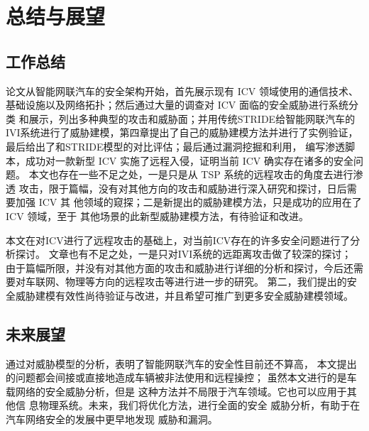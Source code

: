 \chapter{总结与展望}
\label{ch6}

\section{工作总结}
论文从智能网联汽车的安全架构开始，首先展示现有 ICV 领域使用的通信技术、
基础设施以及网络拓扑；然后通过大量的调查对 ICV 面临的安全威胁进行系统分类
和展示，列出多种典型的攻击和威胁面；并用传统STRIDE给智能网联汽车的IVI系统进行了威胁建模，第四章提出了自己的威胁建模方法并进行了实例验证，最后给出了和STRIDE模型的对比评估；最后通过漏洞挖掘和利用，
编写渗透脚本，成功对一款新型 ICV 实施了远程入侵，证明当前 ICV 确实存在诸多的安全问题。
本文也存在一些不足之处，一是只是从 TSP 系统的远程攻击的角度去进行渗透
攻击，限于篇幅，没有对其他方向的攻击和威胁进行深入研究和探讨，日后需要加强 ICV 其
他领域的窥探；二是新提出的威胁建模方法，只是成功的应用在了 ICV 领域，至于
其他场景的此新型威胁建模方法，有待验证和改进。

本文在对ICV进行了远程攻击的基础上，对当前ICV存在的许多安全问题进行了分析探讨。
文章也有不足之处，一是只对IVI系统的远距离攻击做了较深的探讨；
由于篇幅所限，并没有对其他方面的攻击和威胁进行详细的分析和探讨，今后还需要对车联网、物理等方向的远程攻击等进行进一步的研究。
第二，我们提出的安全威胁建模有效性尚待验证与改进，并且希望可推广到更多安全威胁建模领域。

\section{未来展望}
通过对威胁模型的分析，表明了智能网联汽车的安全性目前还不算高， 本文提出的问题都会间接或直接地造成车辆被非法使用和远程操控；
虽然本文进行的是车载网络的安全威胁分析，但是
这种方法并不局限于汽车领域。它也可以应用于其他信
息物理系统。未来，我们将优化方法，进行全面的安全
威胁分析，有助于在汽车网络安全的发展中更早地发现
威胁和漏洞。